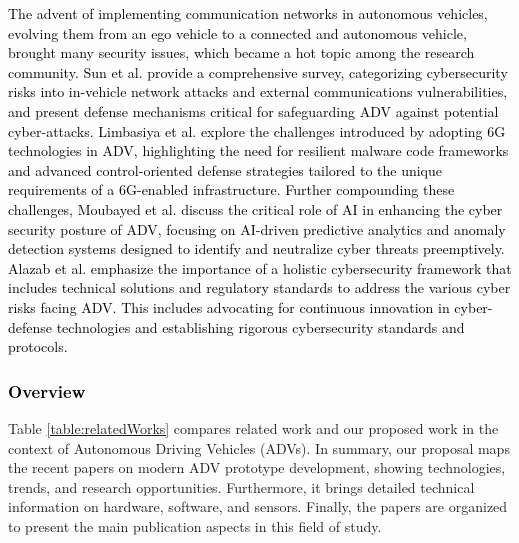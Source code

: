 \documentclass[lettersize,journal]{IEEEtran}
\begin{document}
  \textcolor{black}{The advent of implementing communication networks in autonomous vehicles, evolving them from an ego vehicle to a connected and autonomous vehicle, brought many security issues, which became a hot topic among the research community. Sun et al. \cite{sun2022} provide a comprehensive survey, categorizing cybersecurity risks into in-vehicle network attacks and external communications vulnerabilities, and present defense mechanisms critical for safeguarding ADV against potential cyber-attacks. Limbasiya et al. \cite{LIMBASIYA2022} explore the challenges introduced by adopting 6G technologies in ADV, highlighting the need for resilient malware code frameworks and advanced control-oriented defense strategies tailored to the unique requirements of a 6G-enabled infrastructure. Further compounding these challenges, Moubayed et al. \cite{moubayed2022} discuss the critical role of AI in enhancing the cyber security posture of ADV, focusing on AI-driven predictive analytics and anomaly detection systems designed to identify and neutralize cyber threats preemptively. Alazab et al. \cite{alazab2023} emphasize the importance of a holistic cybersecurity framework that includes technical solutions and regulatory standards to address the various cyber risks facing ADV. This includes advocating for continuous innovation in cyber-defense technologies and establishing rigorous cybersecurity standards and protocols.}

\vspace{1em}

\subsubsection {\textcolor{black}{\textbf{Overview}}}

\leavevmode\vspace{0.1\baselineskip}%
 
Table \ref{table:relatedWorks} compares related work and our proposed work in the context of Autonomous Driving Vehicles (ADVs). In summary, our proposal maps the recent papers on modern ADV prototype development, showing technologies, trends, and research opportunities. Furthermore, it brings detailed technical information on hardware, software, and sensors. Finally, the papers are organized to present the main publication aspects in this field of study.
\end{document}

